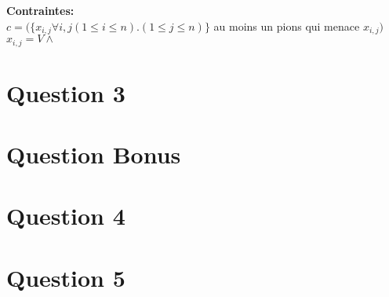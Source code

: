 \documentclass[a4paper,10pt]{article}
\begin{document}
\textbf{Contraintes:}\\
$ c = (\{x_{i,j} \forall i,j (1 \leq i \leq n).(1 \leq j \leq n)\}$ au moins un pions qui menace $x_{i,j} )$
$ x_{i,j} = V \land $

\section{Question 3}

\section{Question Bonus}

\section{Question 4}

\section{Question 5}
\end{document}
